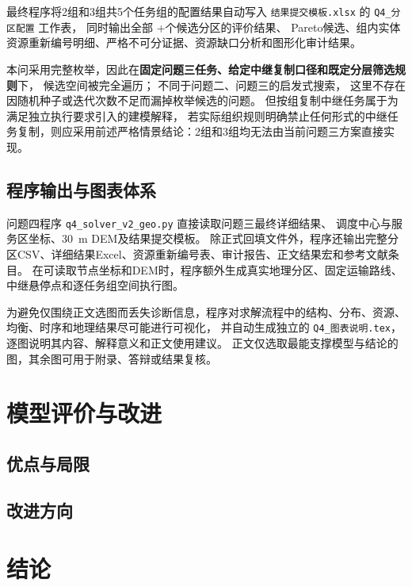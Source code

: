 最终程序将2组和3组共5个任务组的配置结果自动写入
\texttt{结果提交模板.xlsx} 的 \texttt{Q4\_分区配置} 工作表，
同时输出全部 \QFourKTwoPartitionNum+\QFourKThreePartitionNum 个候选分区的评价结果、
Pareto候选、组内实体资源重新编号明细、严格不可分证据、资源缺口分析和图形化审计结果。

本问采用完整枚举，因此在\textbf{固定问题三任务、给定中继复制口径和既定分层筛选规则}下，
候选空间被完全遍历；
不同于问题二、问题三的启发式搜索，
这里不存在因随机种子或迭代次数不足而漏掉枚举候选的问题。
但按组复制中继任务属于为满足独立执行要求引入的建模解释，
若实际组织规则明确禁止任何形式的中继任务复制，则应采用前述严格情景结论：2组和3组均无法由当前问题三方案直接实现。

\subsection{程序输出与图表体系}

问题四程序 \texttt{q4\_solver\_v2\_geo.py} 直接读取问题三最终详细结果、
调度中心与服务区坐标、30~m DEM及结果提交模板。
除正式回填文件外，程序还输出完整分区CSV、详细结果Excel、资源重新编号表、审计报告、正文结果宏和参考文献条目。
在可读取节点坐标和DEM时，程序额外生成真实地理分区、固定运输路线、中继悬停点和逐任务组空间执行图。

为避免仅围绕正文选图而丢失诊断信息，程序对求解流程中的结构、分布、资源、均衡、时序和地理结果尽可能进行可视化，
并自动生成独立的 \texttt{Q4\_图表说明.tex}，逐图说明其内容、解释意义和正文使用建议。
正文仅选取最能支撑模型与结论的图，其余图可用于附录、答辩或结果复核。



\section{模型评价与改进}
\subsection{优点与局限}

\subsection{改进方向}

\section{结论}
